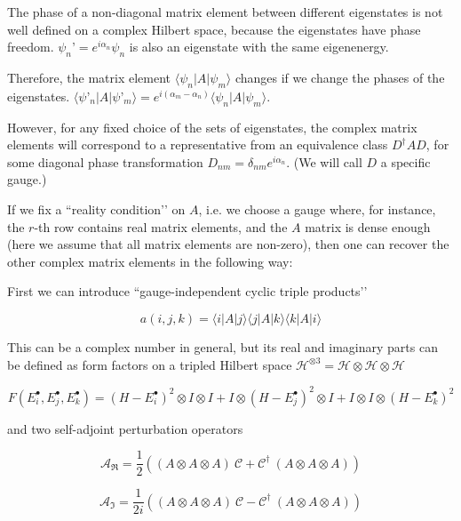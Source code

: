 \documentclass{article}
\theoremstyle{definition}
\begin{document}
The phase of a non-diagonal matrix element between different eigenstates is not well defined on a complex Hilbert space, because the eigenstates have phase freedom.
$\psi_n’=e^{i \alpha_n} \psi_n$ is also an eigenstate with the same eigenenergy.

Therefore, the matrix element $\langle \psi_n | A | \psi_m \rangle$ changes if we change the phases of the eigenstates. $\langle \psi’_n | A | \psi’_m \rangle=e^{i(\alpha_m-\alpha_n)}\langle \psi_n | A | \psi_m \rangle$.

However, for any fixed choice of the sets of eigenstates, the complex matrix elements will correspond to a representative from an equivalence class $D^\dagger A D$, for some diagonal phase transformation $D_{nm}=\delta_{nm} e^{i \alpha_n}$. (We will call $D$ a specific gauge.)

If we fix a ``reality condition’’ on $A$, i.e. we choose a gauge where, for instance, the $r$-th row contains real matrix elements, and the $A$ matrix is dense enough (here we assume that all matrix elements are non-zero), then one can recover the other complex matrix elements in the following way:

First we can introduce ``gauge-independent cyclic triple products’’

\begin{equation}
a(i,j,k)=\langle i | A | j \rangle \langle j | A | k \rangle \langle k | A | i \rangle
\end{equation}

This can be a complex number in general, but its real and imaginary parts can be defined as form factors on a tripled Hilbert space $\mathcal{H}^{\otimes 3} = \mathcal{H} \otimes \mathcal{H} \otimes \mathcal{H}$

\begin{equation}
F(E_i^\bullet,E_j^\bullet,E_k^\bullet)
=
(H-E_i^\bullet)^2 \otimes I \otimes I +
I \otimes (H-E_j^\bullet)^2 \otimes I +
I \otimes I \otimes (H-E_k^\bullet)^2
\end{equation}

and two self-adjoint perturbation operators

\begin{equation}
\mathcal{A}_\Re
=
\frac{1}{2}
\left (
(A \otimes A \otimes A) \ \mathcal{C}
+
\mathcal{C}^\dagger \ (A \otimes A \otimes A)
\right )
\end{equation}

\begin{equation}
\mathcal{A}_\Im
=
\frac{1}{2 i}
\left (
(A \otimes A \otimes A) \ \mathcal{C}
-
\mathcal{C}^\dagger \ (A \otimes A \otimes A)
\right )
\end{equation}
\end{document}
